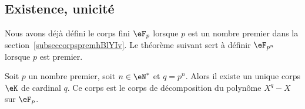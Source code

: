 \subsection{Existence, unicité}

Nous avons déjà défini le corps fini \( \eF_p\) lorsque \( p\) est un nombre premier dans la section~\ref{subseccorpspremhBlYIv}. Le théorème suivant sert à définir \( \eF_{p^n}\) lorsque \( p\) est premier.
\begin{theorem}     \label{ThoOzgSfy}
    Soit \( p\) un nombre premier, soit \( n\in \eN^*\) et \( q=p^n\). Alors il existe un unique corps \( \eK\) de cardinal \( q\). Ce corps est le corps de décomposition du polynôme \( X^q-X\) sur \( \eF_p\).
\end{theorem}

